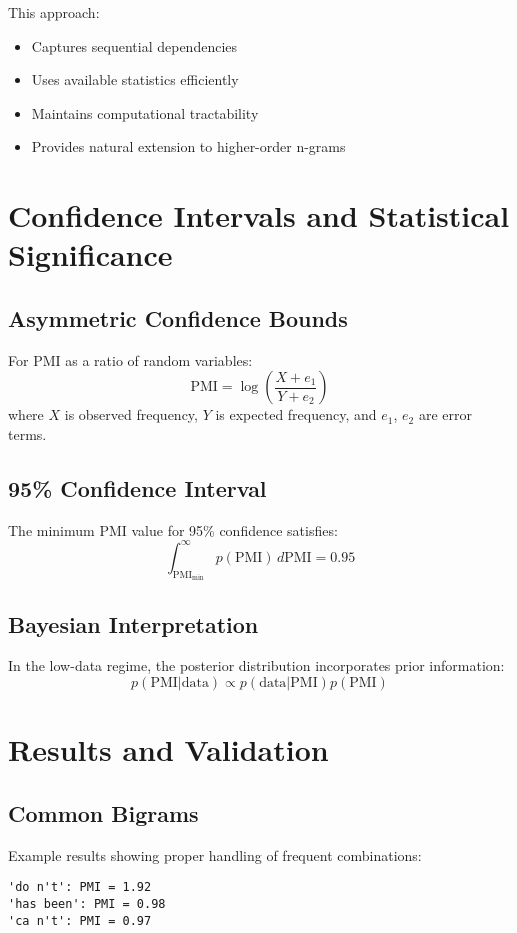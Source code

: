 \documentclass[12pt,a4paper]{article}
\begin{document}
This approach:
\begin{itemize}
    \item Captures sequential dependencies
    \item Uses available statistics efficiently
    \item Maintains computational tractability
    \item Provides natural extension to higher-order n-grams
\end{itemize}

\section{Confidence Intervals and Statistical Significance}

\subsection{Asymmetric Confidence Bounds}
For PMI as a ratio of random variables:
\begin{equation}
    \text{PMI} = \log\left(\frac{X + e_1}{Y + e_2}\right)
\end{equation}
where $X$ is observed frequency, $Y$ is expected frequency, and $e_1$, $e_2$ are error terms.

\subsection{95\% Confidence Interval}
The minimum PMI value for 95\% confidence satisfies:
\begin{equation}
    \int_{\text{PMI}_{\text{min}}}^{\infty} p(\text{PMI}) \, d\text{PMI} = 0.95
\end{equation}

\subsection{Bayesian Interpretation}
In the low-data regime, the posterior distribution incorporates prior information:
\begin{equation}
    p(\text{PMI}|\text{data}) \propto p(\text{data}|\text{PMI})p(\text{PMI})
\end{equation}

\section{Results and Validation}

\subsection{Common Bigrams}
Example results showing proper handling of frequent combinations:
\begin{verbatim}
'do n't': PMI = 1.92
'has been': PMI = 0.98
'ca n't': PMI = 0.97
\end{verbatim}
\end{document}
